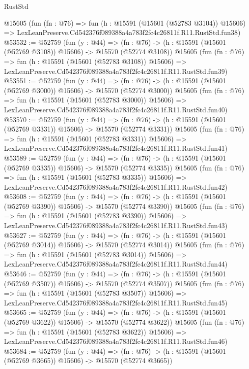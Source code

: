 \begin{lexlean}{RustStd}
\begin{coremodule}
    @15605
    (fun (fn : @76) =>
    fun (h : @15591 (@15601 (@52783 @3104)) @15606) =>
    LexLeanPreserve.Cd542376f089388a4a783f2fc4c26811f.R11.RustStd.fun38)
@53532 := @52759
    (fun (y : @44) =>
    (fn : @76) -> (h : @15591 (@15601 (@52769 @3108)) @15606) -> @15570 (@52774 @3108))
    @15605
    (fun (fn : @76) =>
    fun (h : @15591 (@15601 (@52783 @3108)) @15606) =>
    LexLeanPreserve.Cd542376f089388a4a783f2fc4c26811f.R11.RustStd.fun39)
@53551 := @52759
    (fun (y : @44) =>
    (fn : @76) -> (h : @15591 (@15601 (@52769 @3000)) @15606) -> @15570 (@52774 @3000))
    @15605
    (fun (fn : @76) =>
    fun (h : @15591 (@15601 (@52783 @3000)) @15606) =>
    LexLeanPreserve.Cd542376f089388a4a783f2fc4c26811f.R11.RustStd.fun40)
@53570 := @52759
    (fun (y : @44) =>
    (fn : @76) -> (h : @15591 (@15601 (@52769 @3331)) @15606) -> @15570 (@52774 @3331))
    @15605
    (fun (fn : @76) =>
    fun (h : @15591 (@15601 (@52783 @3331)) @15606) =>
    LexLeanPreserve.Cd542376f089388a4a783f2fc4c26811f.R11.RustStd.fun41)
@53589 := @52759
    (fun (y : @44) =>
    (fn : @76) -> (h : @15591 (@15601 (@52769 @3335)) @15606) -> @15570 (@52774 @3335))
    @15605
    (fun (fn : @76) =>
    fun (h : @15591 (@15601 (@52783 @3335)) @15606) =>
    LexLeanPreserve.Cd542376f089388a4a783f2fc4c26811f.R11.RustStd.fun42)
@53608 := @52759
    (fun (y : @44) =>
    (fn : @76) -> (h : @15591 (@15601 (@52769 @3390)) @15606) -> @15570 (@52774 @3390))
    @15605
    (fun (fn : @76) =>
    fun (h : @15591 (@15601 (@52783 @3390)) @15606) =>
    LexLeanPreserve.Cd542376f089388a4a783f2fc4c26811f.R11.RustStd.fun43)
@53627 := @52759
    (fun (y : @44) =>
    (fn : @76) -> (h : @15591 (@15601 (@52769 @3014)) @15606) -> @15570 (@52774 @3014))
    @15605
    (fun (fn : @76) =>
    fun (h : @15591 (@15601 (@52783 @3014)) @15606) =>
    LexLeanPreserve.Cd542376f089388a4a783f2fc4c26811f.R11.RustStd.fun44)
@53646 := @52759
    (fun (y : @44) =>
    (fn : @76) -> (h : @15591 (@15601 (@52769 @3507)) @15606) -> @15570 (@52774 @3507))
    @15605
    (fun (fn : @76) =>
    fun (h : @15591 (@15601 (@52783 @3507)) @15606) =>
    LexLeanPreserve.Cd542376f089388a4a783f2fc4c26811f.R11.RustStd.fun45)
@53665 := @52759
    (fun (y : @44) =>
    (fn : @76) -> (h : @15591 (@15601 (@52769 @3622)) @15606) -> @15570 (@52774 @3622))
    @15605
    (fun (fn : @76) =>
    fun (h : @15591 (@15601 (@52783 @3622)) @15606) =>
    LexLeanPreserve.Cd542376f089388a4a783f2fc4c26811f.R11.RustStd.fun46)
@53684 := @52759
    (fun (y : @44) =>
    (fn : @76) -> (h : @15591 (@15601 (@52769 @3665)) @15606) -> @15570 (@52774 @3665))

\end{coremodule}
\end{lexlean}
